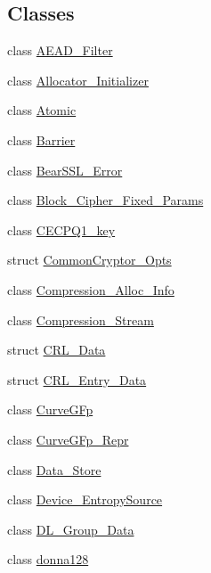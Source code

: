 \subsection*{Classes}
\begin{DoxyCompactItemize}
\item 
class \mbox{\hyperlink{class_botan_1_1_a_e_a_d___filter}{A\+E\+A\+D\+\_\+\+Filter}}
\item 
class \mbox{\hyperlink{class_botan_1_1_allocator___initializer}{Allocator\+\_\+\+Initializer}}
\item 
class \mbox{\hyperlink{class_botan_1_1_atomic}{Atomic}}
\item 
class \mbox{\hyperlink{class_botan_1_1_barrier}{Barrier}}
\item 
class \mbox{\hyperlink{class_botan_1_1_bear_s_s_l___error}{Bear\+S\+S\+L\+\_\+\+Error}}
\item 
class \mbox{\hyperlink{class_botan_1_1_block___cipher___fixed___params}{Block\+\_\+\+Cipher\+\_\+\+Fixed\+\_\+\+Params}}
\item 
class \mbox{\hyperlink{class_botan_1_1_c_e_c_p_q1__key}{C\+E\+C\+P\+Q1\+\_\+key}}
\item 
struct \mbox{\hyperlink{struct_botan_1_1_common_cryptor___opts}{Common\+Cryptor\+\_\+\+Opts}}
\item 
class \mbox{\hyperlink{class_botan_1_1_compression___alloc___info}{Compression\+\_\+\+Alloc\+\_\+\+Info}}
\item 
class \mbox{\hyperlink{class_botan_1_1_compression___stream}{Compression\+\_\+\+Stream}}
\item 
struct \mbox{\hyperlink{struct_botan_1_1_c_r_l___data}{C\+R\+L\+\_\+\+Data}}
\item 
struct \mbox{\hyperlink{struct_botan_1_1_c_r_l___entry___data}{C\+R\+L\+\_\+\+Entry\+\_\+\+Data}}
\item 
class \mbox{\hyperlink{class_botan_1_1_curve_g_fp}{Curve\+G\+Fp}}
\item 
class \mbox{\hyperlink{class_botan_1_1_curve_g_fp___repr}{Curve\+G\+Fp\+\_\+\+Repr}}
\item 
class \mbox{\hyperlink{class_botan_1_1_data___store}{Data\+\_\+\+Store}}
\item 
class \mbox{\hyperlink{class_botan_1_1_device___entropy_source}{Device\+\_\+\+Entropy\+Source}}
\item 
class \mbox{\hyperlink{class_botan_1_1_d_l___group___data}{D\+L\+\_\+\+Group\+\_\+\+Data}}
\item 
class \mbox{\hyperlink{class_botan_1_1donna128}{donna128}}

\end{DoxyCompactItemize}
